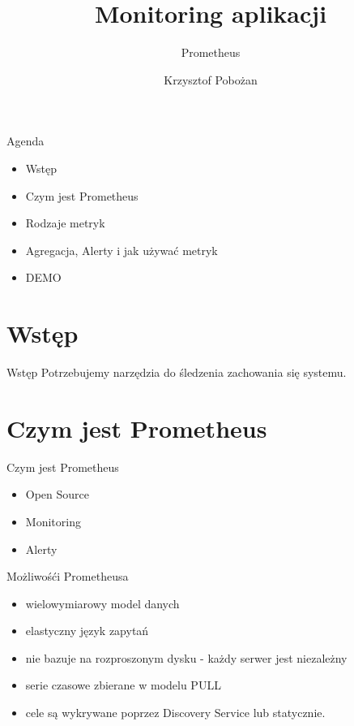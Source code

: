 \documentclass[epic,eepic,aspectratio=169,12pt]{beamer}
\begin{document}
	\title{Monitoring aplikacji}
	\subtitle{Prometheus}
	\author{Krzysztof Pobożan}
\begin{frame}
	\maketitle
\end{frame}
\begin{frame}{Agenda}
	\begin{itemize}
		\item Wstęp
		\item Czym jest Prometheus
		\item Rodzaje metryk
		\item Agregacja, Alerty i jak używać metryk
		\item DEMO
	\end{itemize}
\end{frame}
\section{Wstęp}
\begin{frame}{Wstęp}
	Potrzebujemy narzędzia do śledzenia zachowania się systemu.
\end{frame}
\section{Czym jest Prometheus}
\begin{frame}{Czym jest Prometheus}
	\begin{itemize}
		\item Open Source \pause
		\item Monitoring \pause		
		\item Alerty
	\end{itemize}
\end{frame}
\begin{frame}{Możliwośći Prometheusa}
	\begin{itemize}
		\item  wielowymiarowy model danych
		\item  elastyczny język zapytań
		\item nie bazuje na rozproszonym dysku - każdy serwer jest niezależny
		\item serie czasowe zbierane w modelu PULL
		\item cele są wykrywane poprzez Discovery Service lub statycznie.
	\end{itemize}
\end{frame}
\end{document}
